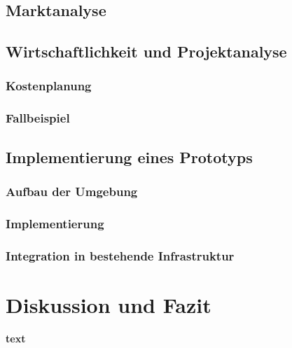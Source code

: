 \documentclass[a4paper, 12pt, oneside]{scrbook}
\begin{document}
			
			
	
	\section{Marktanalyse}
	
	
	\section{Wirtschaftlichkeit und Projektanalyse}
	
		\subsection{Kostenplanung}
		
		\subsection{Fallbeispiel}
	
	\section{Implementierung eines Prototyps}
	
		\subsection{Aufbau der Umgebung}
		
		\subsection{Implementierung}
		
			
		
		\subsection{Integration in bestehende Infrastruktur}
			

	
	
	\chapter{Diskussion und Fazit}\label{ch:Diskussion_Fazit}
	
	
	
	
	\frontmatter
	\printbibliography
	
	\textbf{text}
\end{document}
